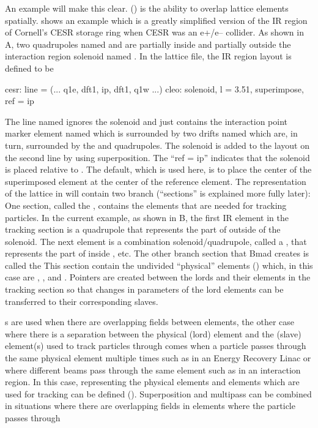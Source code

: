 An example will make this clear.   () is the ability to overlap
lattice elements spatially.  shows an example which is a greatly simplified version
of the IR region of Cornell's CESR storage ring when CESR was an e+/e-- collider. As shown in
A, two quadrupoles named  and  are partially inside and partially
outside the interaction region solenoid named . In the lattice file, the IR region layout
is defined to be
 {\small
\begin{example}
  cesr: line = (... q1e, dft1, ip, dft1, q1w ...)
  cleo: solenoid, l = 3.51, superimpose, ref = ip
\end{example}
 }
The line named  ignores the solenoid and just contains the interaction point marker element
named  which is surrounded by two drifts named  which are, in turn, surrounded by
the  and  quadrupoles. The solenoid is added to the layout on the second line by
using superposition. The ``ref = ip'' indicates that the solenoid is placed relative to . The
default, which is used here, is to place the center of the superimposed  element at the
center of the  reference element.  The representation of the lattice in \bmad will contain
two branch  (``sections'' is explained more fully later): One section, called the
, contains the elements that are needed for tracking particles. In the current
example, as shown in B, the first IR element in the tracking section is a quadrupole
that represents the part of  outside of the solenoid. The next element is a combination
solenoid/quadrupole, called a , that represents the part of  inside ,
etc.  The other branch section that Bmad creates is called the  This section
contain the undivided ``physical''  elements () which, in this case are
, , and . Pointers are created between the lords and their 
elements in the tracking section so that changes in parameters of the lord elements can be
transferred to their corresponding slaves.

s are used when there are overlapping fields between elements, the other case where
there is a separation between the physical (lord) element and the (slave) element(s) used to track
particles through comes when a particle passes through the same physical element multiple times such
as in an Energy Recovery Linac or where different beams pass through the same element such as in an
interaction region. In this case,  representing the physical elements and
 elements which are used for tracking can be defined ().
Superposition and multipass can be combined in situations where there are overlapping fields in
elements where the particle passes through

